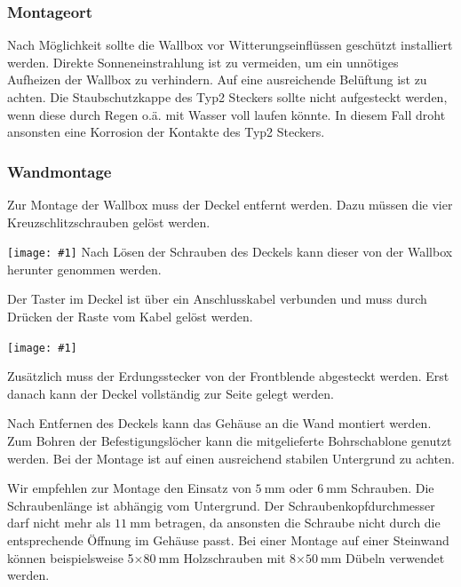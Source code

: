 \documentclass[a4paper,10pt]{article}
\newcommand{\hint}[1]{\begin{tcolorbox}[colback=boxgray,colframe=black,coltext=
white,title=Hinweis,left*=2mm,right*=2mm,boxsep=1mm,bottom=1mm,top=1mm]#1\end{tcolorbox}}
\newcommand{\gfx}[1]{\texttt{[image: \#1]}}
\begin{document}
\begin{multicols*}{2}
    \subsubsection{Montageort}
    Nach Möglichkeit sollte die Wallbox vor Witterungseinflüssen geschützt
    installiert werden. Direkte Sonneneinstrahlung ist zu vermeiden, um ein
    unnötiges Aufheizen der Wallbox zu verhindern. Auf eine ausreichende Belüftung
    ist zu achten. Die Staubschutzkappe des Typ2 Steckers sollte nicht aufgesteckt
    werden, wenn diese durch Regen o.ä. mit Wasser voll laufen könnte. In diesem Fall
    droht ansonsten eine Korrosion der Kontakte des Typ2 Steckers.

    \subsubsection{Wandmontage}\label{wandmontage}
    Zur Montage der Wallbox muss der Deckel entfernt werden. Dazu müssen die
    vier Kreuzschlitzschrauben gelöst werden.

    \gfx{./img_warp2/resized/warp_screw_points_ready}
    Nach Lösen der Schrauben des Deckels kann dieser von der Wallbox herunter genommen
    werden.

    \hint{Der Taster im Deckel ist über ein Anschlusskabel verbunden und muss
        durch Drücken der Raste vom Kabel gelöst werden.}

    \gfx{./img_warp2/resized/warp2_button_and_gnd_600}

    Zusätzlich muss der Erdungsstecker von der Front\-blende abgesteckt werden.
    Erst danach kann der Deckel vollständig zur Seite gelegt werden.

    Nach Entfernen des Deckels kann das Gehäuse an die Wand montiert werden. Zum
    Bohren der Befestigungslöcher kann die mitgelieferte Bohrschablone genutzt
    werden. Bei der Montage ist auf einen ausreichend stabilen Untergrund zu
    achten.

    Wir empfehlen zur Montage den Einsatz von $\SI{5}{\milli\meter}$ oder
    $\SI{6}{\milli\meter}$ Schrauben. Die Schraubenlänge ist abhängig vom
    Untergrund. Der Schraubenkopfdurchmesser darf nicht mehr als
    $\SI{11}{\milli\meter}$ betragen, da ansonsten die Schraube nicht durch die
    entsprechende Öffnung im Gehäuse passt. Bei einer Montage auf einer Steinwand
    können beispielsweise 5$\times\SI{80}{\milli\meter}$ Holzschrauben
    mit 8$\times\SI{50}{\milli\meter}$ Dübeln  verwendet werden.


\end{multicols*}
\end{document}
